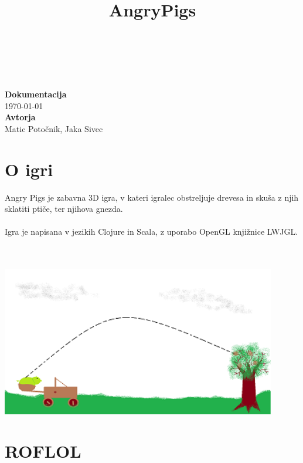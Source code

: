 \documentclass[10pt,a4paper,oneside]{book}
\title{AngryPigs}
\newcommand\br{%
 \ \\ \ \\%
}
\begin{document}
\begin{titlepage}
\begin{center}
\ \\[3.5cm]
{}\\[-2.8cm]
{}\\[3.9cm]
{\Huge\bf Dokumentacija}\\[0.35cm]
{\huge\today}\ \\[4.5cm]
{\Huge {\bf Avtorja}}\\[0.35cm]
{\huge Matic Potočnik, Jaka Sivec}
\vfill
\end{center}
\end{titlepage}
\chapter{O igri}
Angry Pigs je zabavna 3D igra, v kateri igralec obstreljuje drevesa in skuša z njih sklatiti ptiče, ter njihova gnezda. 
\br
Igra je napisana v jezikih Clojure in Scala, z uporabo OpenGL knjižnice LWJGL.
\br
\begin{center}
\includegraphics[width=12cm]{conceptsmall}
\end{center}

\chapter{ROFLOL}
\end{document}
